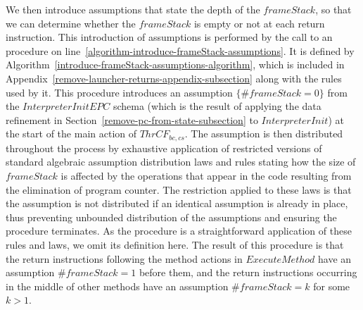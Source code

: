 We then introduce assumptions that state the depth of the
$frameStack$, so that we can determine whether the $frameStack$ is
empty or not at each return instruction.
This introduction of assumptions is performed by the call to an
 procedure on
line~\ref{algorithm-introduce-frameStack-assumptions}.
It is defined by
Algorithm~\ref{introduce-frameStack-assumptions-algorithm}, which is
included in Appendix~\ref{remove-launcher-returns-appendix-subsection}
along with the rules used by it. 
This procedure introduces an assumption $\{\# frameStack = 0 \}$ from
the $InterpreterInitEPC$ schema (which is the result of applying the
data refinement in Section~\ref{remove-pc-from-state-subsection} to
$InterpreterInit$) at the start of the main action of $ThrCF_{bc,cs}$.
The assumption is then distributed throughout the process by
exhaustive application of restricted versions of standard algebraic
assumption distribution laws and rules stating how the size of
$frameStack$ is affected by the operations that appear in the code
resulting from the elimination of program counter.
The restriction applied to these laws is that the assumption is not
distributed if an identical assumption is already in place, thus
preventing unbounded distribution of the assumptions and ensuring the
procedure terminates.
As the procedure is a straightforward application of these rules and
laws, we omit its definition here.
The result of this procedure is that the return instructions following
the method actions in $ExecuteMethod$ have an assumption
$\# frameStack = 1$ before them, and the return instructions occurring
in the middle of other methods have an assumption $\# frameStack = k$
for some $k > 1$.

